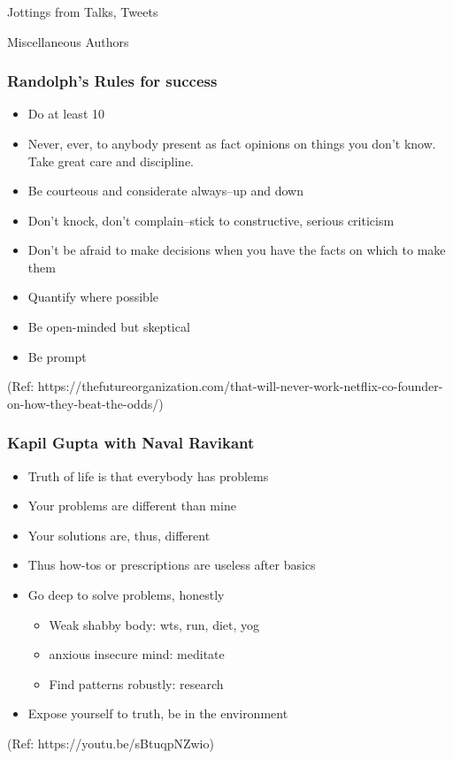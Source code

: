 \begin{frame}[fragile]\frametitle{}
\begin{center}
{\Large Jottings from Talks, Tweets}

{\small Miscellaneous Authors }


\end{center}
\end{frame}

\begin{frame}[fragile]\frametitle{ Randolph's Rules for success }

	\begin{itemize}
	\item Do at least 10%
	\item Never, ever, to anybody present as fact opinions on things you don’t know. Take great care and discipline.
	\item Be courteous and considerate always–up and down
	\item Don’t knock, don’t complain–stick to constructive, serious criticism
	\item Don’t be afraid to make decisions when you have the facts on which to make them
	\item Quantify where possible
	\item Be open-minded but skeptical
	\item Be prompt
	\end{itemize}

{\tiny (Ref: https://thefutureorganization.com/that-will-never-work-netflix-co-founder-on-how-they-beat-the-odds/)}

\end{frame}


\begin{frame}[fragile]\frametitle{ Kapil Gupta with Naval Ravikant}

	\begin{itemize}
	\item Truth of life is that everybody has problems 
	\item Your problems are different than mine
	\item Your solutions are, thus, different 
	\item Thus how-tos or prescriptions are useless after basics
	\item Go deep to solve problems, honestly 
	\begin{itemize}
		\item Weak shabby body: wts, run, diet, yog
		\item anxious insecure mind: meditate
		\item Find patterns robustly: research
	\end{itemize}
	\item Expose yourself to truth, be in the environment 
	\end{itemize}

{\tiny (Ref: https://youtu.be/sBtuqpNZwio)}

\end{frame}


